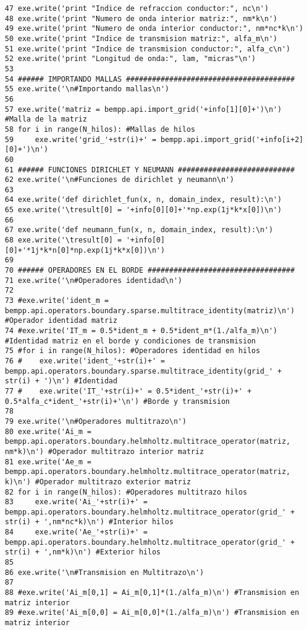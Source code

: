 \documentclass[12pt,letterpaper]{report}
\numberwithin{equation}{section}
\begin{document}
\begin{lstlisting}
47 exe.write('print "Indice de refraccion conductor:", nc\n')
48 exe.write('print "Numero de onda interior matriz:", nm*k\n')
49 exe.write('print "Numero de onda interior conductor:", nm*nc*k\n')
50 exe.write('print "Indice de transmision matriz:", alfa_m\n')
51 exe.write('print "Indice de transmision conductor:", alfa_c\n')
52 exe.write('print "Longitud de onda:", lam, "micras"\n')
53 
54 ###### IMPORTANDO MALLAS #######################################
55 exe.write('\n#Importando mallas\n')
56 
57 exe.write('matriz = bempp.api.import_grid('+info[1][0]+')\n') #Malla de la matriz
58 for i in range(N_hilos): #Mallas de hilos
59     exe.write('grid_'+str(i)+' = bempp.api.import_grid('+info[i+2][0]+')\n')
60 
61 ###### FUNCIONES DIRICHLET Y NEUMANN ###########################
62 exe.write('\n#Funciones de dirichlet y neumann\n')
63 
64 exe.write('def dirichlet_fun(x, n, domain_index, result):\n')
65 exe.write('\tresult[0] = '+info[0][0]+'*np.exp(1j*k*x[0])\n')
66 
67 exe.write('def neumann_fun(x, n, domain_index, result):\n')
68 exe.write('\tresult[0] = '+info[0][0]+'*1j*k*n[0]*np.exp(1j*k*x[0])\n')
69 
70 ###### OPERADORES EN EL BORDE ##################################
71 exe.write('\n#Operadores identidad\n')
72 
73 #exe.write('ident_m = bempp.api.operators.boundary.sparse.multitrace_identity(matriz)\n') #Operador identidad matriz
74 #exe.write('IT_m = 0.5*ident_m + 0.5*ident_m*(1./alfa_m)\n') #Identidad matriz en el borde y condiciones de transmision
75 #for i in range(N_hilos): #Operadores identidad en hilos
76 #    exe.write('ident_'+str(i)+' = bempp.api.operators.boundary.sparse.multitrace_identity(grid_' + str(i) + ')\n') #Identidad
77 #    exe.write('IT_'+str(i)+' = 0.5*ident_'+str(i)+' + 0.5*alfa_c*ident_'+str(i)+'\n') #Borde y transmision
78 
79 exe.write('\n#Operadores multitrazo\n')
80 exe.write('Ai_m = bempp.api.operators.boundary.helmholtz.multitrace_operator(matriz, nm*k)\n') #Operador multitrazo interior matriz
81 exe.write('Ae_m = bempp.api.operators.boundary.helmholtz.multitrace_operator(matriz, k)\n') #Operador multitrazo exterior matriz
82 for i in range(N_hilos): #Operadores multitrazo hilos
83     exe.write('Ai_'+str(i)+' = bempp.api.operators.boundary.helmholtz.multitrace_operator(grid_' + str(i) + ',nm*nc*k)\n') #Interior hilos
84     exe.write('Ae_'+str(i)+' = bempp.api.operators.boundary.helmholtz.multitrace_operator(grid_' + str(i) + ',nm*k)\n') #Exterior hilos
85 
86 exe.write('\n#Transmision en Multitrazo\n')
87 
88 #exe.write('Ai_m[0,1] = Ai_m[0,1]*(1./alfa_m)\n') #Transmision en matriz interior
89 #exe.write('Ai_m[0,0] = Ai_m[0,0]*(1./alfa_m)\n') #Transmision en matriz interior

\end{lstlisting}
\end{document}
